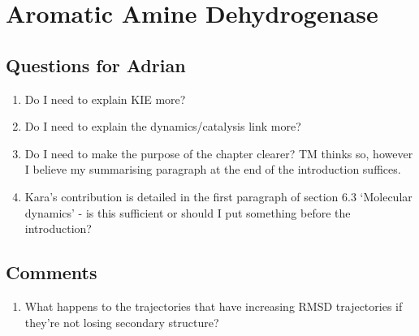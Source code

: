 %
%

\chapter{Aromatic Amine Dehydrogenase}
\label{chap:aadh}

\section{Questions for Adrian}

\begin{enumerate}
    \item Do I need to explain KIE more? 
    \item Do I need to explain the dynamics/catalysis link more? 
    \item Do I need to make the purpose of the chapter clearer?  TM thinks so, however I believe my summarising paragraph at the end of the introduction suffices. 
    \item Kara's contribution is detailed in the first paragraph of section 6.3 `Molecular dynamics' - is this sufficient or should I put something before the introduction? 
\end{enumerate}

\section{Comments}
\begin{enumerate}
    \item What happens to the trajectories that have increasing RMSD trajectories if they're not losing secondary structure? 
\end{enumerate}


